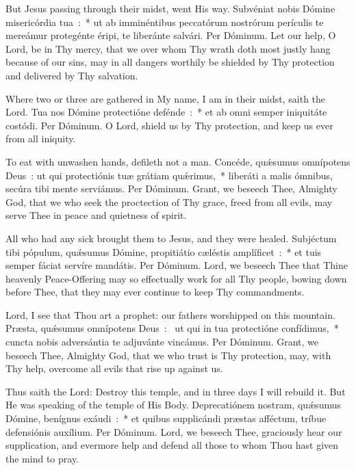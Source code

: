 {{  
  {But Jesus passing through their midst, went His way.}
  {Subvéniat nobis Dómine misericórdia tua~:~* ut ab imminéntibus peccatórum nostrórum perículis te mereámur protegénte éripi, te liberánte salvári. Per Dóminum.}
  {Let our help, O Lord, be in Thy mercy, that we over whom Thy wrath doth most justly hang because of our sins, may in all dangers worthily be shielded by Thy protection and delivered by Thy salvation.}

  {Where two or three are gathered in My name, I am in their midst, saith the Lord.}
  {Tua nos Dómine protectióne defénde~:~* et ab omni semper iniquitáte costódi. Per Dóminum.}
  {O Lord, shield us by Thy protection, and keep us ever from all iniquity.}

  {To eat with unwashen hands, defileth not a man.}
  {Concéde, quǽsumus omnípotens Deus~: ut qui protectiónis tuæ grátiam quǽrimus,~* liberáti a malis ómnibus, secúra tibi mente serviámus. Per Dóminum.}
  {Grant, we beseech Thee, Almighty God, that we who seek the proctection of Thy grace, freed from all evils, may serve Thee in peace and quietness of spirit.}

  {All who had any sick brought them to Jesus, and they were healed.}
  {Subjéctum tibi pópulum, quǽsumus Dómine, propitiátio cæléstis amplíficet~:~* et tuis semper fáciat servíre mandátis. Per Dóminum.}
  {Lord, we beseech Thee that Thine heavenly Peace-Offering may so effectually work for all Thy people, bowing down before Thee, that they may ever continue to keep Thy commandments.}

  {Lord, I see that Thou art a prophet: our fathers worshipped on this mountain.}
  {Præsta, quǽsumus omnípotens Deus~:~\dag{} ut qui in tua protectióne confídimus,~* cuncta nobis adversántia te adjuvánte vincámus. Per Dóminum.}
  {Grant, we beseech Thee, Almighty God, that we who trust is Thy protection, may, with Thy help, overcome all evils that rise up against us.}

  {Thus saith the Lord: Destroy this temple, and in three days I will rebuild it. But He was speaking of the temple of His Body.}
  {Deprecatiónem nostram, quǽ\-su\-mus Dómine, benígnus exáudi~:~* et quibus supplicándi præstas afféctum, tríbue defensiónis auxílium. Per Dóminum.}
  {Lord, we beseech Thee, graciously hear our supplication, and evermore help and defend all those to whom Thou hast given the mind to pray.}

}}
